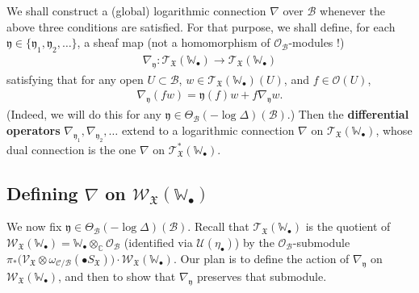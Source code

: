 \documentclass[12pt,a4paper,notitlepage]{report}
\theoremstyle{definition}
\theoremstyle{plain}
\newcommand{\fk}{\mathfrak}
\newcommand{\mc}{\mathcal}
\newcommand{\scr}{\mathscr}
\newcommand{\blt}{\bullet}
\newcommand{\Wbb}{\mathbb W}
\newcommand{\Cbb}{\mathbb C}
\numberwithin{equation}{section}
\begin{document}
We shall construct a (global) logarithmic connection $\nabla$ over $\mc B$ whenever the above three conditions are satisfied.  For that purpose, we shall define, for each  $\fk y\in\{\fk y_1,\fk y_2,\dots \}$, a sheaf map (not a homomorphism of $\scr O_{\mc B}$-modules !)
\begin{align*}
\nabla_{\fk y}:\scr T_{\fk X}(\Wbb_\blt)\rightarrow\scr T_{\fk X}(\Wbb_\blt)
\end{align*}
satisfying that for any open $U\subset \mc B$, $w\in\scr T_{\fk X}(\Wbb_\blt)(U)$, and $f\in\scr O(U)$,
\begin{align*}
\nabla_{\fk y}(fw)=\fk y(f)w+f\nabla_{\fk y}w.
\end{align*}
(Indeed, we will do this for any $\fk y\in \Theta_{\mc B}(-\log\Delta)(\mc B)$.) Then the  \textbf{differential operators} $\nabla_{\fk y_1},\nabla_{\fk y_2},\dots$ extend to a logarithmic connection $\nabla$ on $\scr T_{\fk X}(\Wbb_\blt)$, whose dual  connection  is the one $\nabla$ on $\scr T_{\fk X}^*(\Wbb_\blt)$.



\subsection*{Defining $\nabla$ on $\scr W_{\fk X}(\Wbb_\blt)$}

We now fix $\fk y\in \Theta_{\mc B}(-\log\Delta)(\mc B)$. Recall that $\scr T_{\fk X}(\Wbb_\blt)$ is the quotient of $\scr W_{\fk X}(\Wbb_\blt)=\Wbb_\blt\otimes_\Cbb \scr O_{\mc B}$ (identified via $\mc U(\eta_\blt)$) by the $\scr O_{\mc B}$-submodule $\pi_*\big(\scr V_{\fk X}\otimes\omega_{\mc C/\mc B}(\blt S_{\fk X})\big)\cdot \scr W_{\fk X}(\Wbb_\blt)$. Our plan is to  define the action of $\nabla_{\fk y}$ on $\scr W_{\fk X}(\Wbb_\blt)$, and then to show that $\nabla_{\fk y}$ preserves that submodule.
\end{document}
